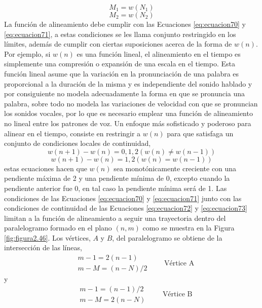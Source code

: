 \begin{enumerate}
\newpage
\begin{equation}
\label{eq:ecuacion70}
M_{1} = w(N_{1})
\end{equation}
\begin{equation}
\label{eq:ecuacion71}
M_{2} = w(N_{2})
\end{equation}
La función de alineamiento debe cumplir con las Ecuaciones \eqref{eq:ecuacion70} y \eqref{eq:ecuacion71}, a estas condiciones se les llama conjunto restringido en los límites, además de cumplir con ciertas suposiciones acerca de la forma de $w(n)$. Por ejemplo, si $w(n)$ es una función lineal, el alineamiento en el tiempo es simplemente una compresión o expansión de una escala en el tiempo. Esta función lineal asume que la variación en la pronunciación de una palabra es proporcional a la duración de la misma y es independiente del sonido hablado y por consiguiente no modela adecuadamente la forma en que se pronuncia una palabra, sobre todo no modela las variaciones de velocidad con que se pronuncian los sonidos vocales, por lo que es necesario emplear una función de alineamiento no lineal entre los patrones de voz.
\vskip 0.5cm
Un enfoque más sofisticado y poderoso para alinear en el tiempo, consiste en restringir a $w(n)$ para que satisfaga un conjunto de condiciones locales de continuidad,
\begin{equation}
\label{eq:ecuacion72}
w(n+1) - w(n) = 0,1,2(w(n) \neq w(n-1))
\end{equation}
\begin{equation}
\label{eq:ecuacion73}
w(n+1) - w(n) = 1,2(w(n) = w(n-1))
\end{equation}
estas ecuaciones hacen que $w(n)$ sea monotónicamente creciente con una pendiente máxima de 2 y una pendiente mínima de 0, excepto cuando la pendiente anterior fue 0, en tal caso la pendiente mínima será de 1. 
\vskip 0.3cm
Las condiciones de las Ecuaciones \eqref{eq:ecuacion70} y \eqref{eq:ecuacion71} junto con las condiciones de continuidad de las Ecuaciones \eqref{eq:ecuacion72} y \eqref{eq:ecuacion73} limitan a la función de alineamiento a seguir una trayectoria dentro del paralelogramo formado en el plano $(n, m)$ como se muestra en la Figura \ref{fig:figura2.46}. Los vértices, $A$ y $B$, del paralelogramo se obtiene de la intersección de las líneas,
\begin{equation}
\label{eq:ecuacion74}
\begin{aligned}
& m - 1 = 2(n - 1) \\
& m - M = (n - N)/2
\end{aligned}
\qquad
\text{Vértice A}
\end{equation}
y
\begin{equation}
\label{eq:ecuacion75}
\begin{aligned}
& m - 1 = (n - 1)/2 \\
& m - M = 2(n - N)
\end{aligned}
\qquad
\text{Vértice B}
\end{equation}


\end{enumerate}
